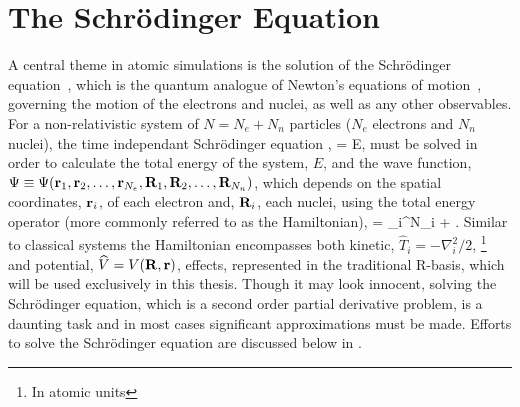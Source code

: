 \section{The Schr\"odinger Equation}
\label{sec:schrodinger}

A central theme in atomic simulations is the solution of the Schr\"odinger equation~\cite{schrodinger-equation-1926}, which is the quantum analogue of Newton's equations of motion~\cite{newton-latin}, governing the motion of the electrons and nuclei, as well as any other observables.
For a non-relativistic system of $N = N_e + N_n$ particles ($N_e$ electrons and $N_n$ nuclei), the time independant Schr\"odinger equation ,
 \Psi = E\Psi,
\eeq
must be solved in order to calculate the total energy of the system, $E$, and the wave function, $\Psi \equiv \Psi({\mathrm{\mathbf{\bm{r}}}}_1, {\mathrm{\mathbf{\bm{r}}}}_2, \ldots, {\mathrm{\mathbf{\bm{r}}}}_{N_e}, {\mathrm{\mathbf{\bm{R}}}}_1, {\mathrm{\mathbf{\bm{R}}}}_2, \ldots, {\mathrm{\mathbf{\bm{R}}}}_{N_n})$, which depends on the spatial coordinates, ${\mathrm{\mathbf{\bm{r}}}}_i$, of each electron and, ${\mathrm{\mathbf{\bm{R}}}}_i$, each nuclei, using the total energy operator (more commonly referred to as the Hamiltonian),
 = \sum_i^{N}_i  + .
\eeq
Similar to classical systems the Hamiltonian encompasses both kinetic, $\widehat{T}_i = -\nabla_i^2/2$, \footnote{In atomic units} and potential, $\widehat{V} = V({\mathrm{\mathbf{\bm{R}}}}, {\mathrm{\mathbf{\bm{r}}}})$, effects, represented in the traditional R-basis, which will be used exclusively in this thesis.
Though it may look innocent, solving the Schr\"odinger equation, which is a second order partial derivative problem, is a daunting task and in most cases significant approximations must be made.
Efforts to solve the Schr\"odinger equation are discussed below in .
